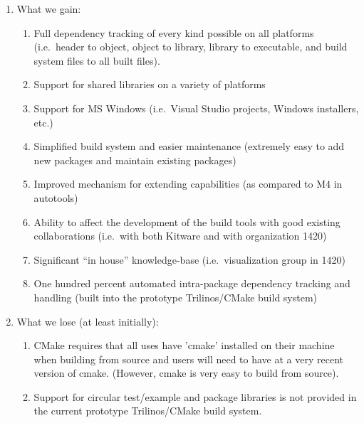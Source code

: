\documentclass[pdf,ps2pdf,11pt]{SANDreport}
\begin{document}
\begin{enumerate}

{}\item What we gain:

  \begin{enumerate}

  {}\item Full dependency tracking of every kind possible on all
  platforms (i.e.\ header to object, object to library, library to
  executable, and build system files to all built files).

  {}\item Support for shared libraries on a variety of platforms

  {}\item Support for MS Windows (i.e.\ Visual Studio projects,
  Windows installers, etc.)

  {}\item Simplified build system and easier maintenance (extremely
  easy to add new packages and maintain existing packages)

  {}\item Improved mechanism for extending capabilities (as compared
  to M4 in autotools)

  {}\item Ability to affect the development of the build tools with
  good existing collaborations (i.e.\ with both Kitware and with
  organization 1420)

  {}\item Significant ``in house'' knowledge-base (i.e.\ visualization
  group in 1420)

  {}\item One hundred percent automated intra-package dependency
  tracking and handling (built into the prototype Trilinos/CMake build
  system)

  \end{enumerate}

{}\item What we lose (at least initially):

  \begin{enumerate}

  {}\item CMake requires that all uses have 'cmake' installed on their
  machine when building from source and users will need to have at a
  very recent version of cmake. (However, cmake is very easy to build
  from source).

  {}\item Support for circular test/example and package libraries is
  not provided in the current prototype Trilinos/CMake build system.

  \end{enumerate}

\end{enumerate}
\end{document}
